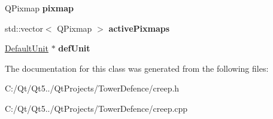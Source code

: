 \begin{DoxyCompactItemize}
\item 
\hypertarget{class_creep_ada4b4fef6191d4f19388a7410dcd60bb}{}Q\+Pixmap {\bfseries pixmap}\label{class_creep_ada4b4fef6191d4f19388a7410dcd60bb}

\item 
\hypertarget{class_creep_a3e5f8851c59350dd6388465a1e497d42}{}std\+::vector$<$ Q\+Pixmap $>$ {\bfseries active\+Pixmaps}\label{class_creep_a3e5f8851c59350dd6388465a1e497d42}

\item 
\hypertarget{class_creep_acc3030437d8751e5cd5f940d163476c8}{}\hyperlink{class_default_unit}{Default\+Unit} $\ast$ {\bfseries def\+Unit}\label{class_creep_acc3030437d8751e5cd5f940d163476c8}

\end{DoxyCompactItemize}


The documentation for this class was generated from the following files\+:\begin{DoxyCompactItemize}
\item 
C\+:/\+Qt/\+Qt5../\+Qt\+Projects/\+Tower\+Defence/creep.\+h\item 
C\+:/\+Qt/\+Qt5../\+Qt\+Projects/\+Tower\+Defence/creep.\+cpp\end{DoxyCompactItemize}

